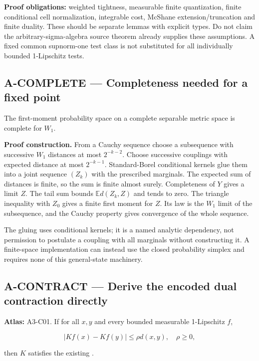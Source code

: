 \documentclass[
  11pt,
  a4paper,
]{article}
\newcommand{\codewrap}[1]{{\ttfamily\seqsplit{#1}}}
\begin{document}
\textbf{Proof obligations:} weighted tightness, measurable finite
quantization, finite conditional cell normalization, integrable cost,
McShane extension/truncation and finite duality. These should be
separate lemmas with explicit types. Do not claim the
arbitrary-sigma-algebra source theorem already supplies these
assumptions. A fixed common supnorm-one test class is not substituted
for all individually bounded 1-Lipschitz tests.

\subsection{A-COMPLETE --- Completeness needed for a fixed
point}\label{a-complete-completeness-needed-for-a-fixed-point}

The first-moment probability space on a complete separable metric space
is complete for \(W_1\).

\textbf{Proof construction.} From a Cauchy sequence choose a subsequence
with successive \(W_1\) distances at most \(2^{-k-2}\). Choose
successive couplings with expected distance at most \(2^{-k-1}\).
Standard-Borel conditional kernels glue them into a joint sequence
\((Z_k)\) with the prescribed marginals. The expected sum of distances
is finite, so the sum is finite almost surely. Completeness of \(Y\)
gives a limit \(Z\). The tail sum bounds \(\mathbb E d(Z_k,Z)\) and
tends to zero. The triangle inequality with \(Z_0\) gives a finite first
moment for \(Z\). Its law is the \(W_1\) limit of the subsequence, and
the Cauchy property gives convergence of the whole sequence.

The gluing uses conditional kernels; it is a named analytic dependency,
not permission to postulate a coupling with all marginals without
constructing it. A finite-space implementation can instead use the
closed probability simplex and requires none of this general-state
machinery.

\subsection{A-CONTRACT --- Derive the encoded dual contraction
directly}\label{a-contract-derive-the-encoded-dual-contraction-directly}

\textbf{Atlas:} A3-C01. If for all \(x,y\) and every bounded measurable
1-Lipschitz \(f\),

\[|Kf(x)-Kf(y)|\le\rho d(x,y),\quad\rho\ge0,\]

then \(K\) satisfies the existing \codewrap{IsW1Contraction\ K\ rho}.
\end{document}
